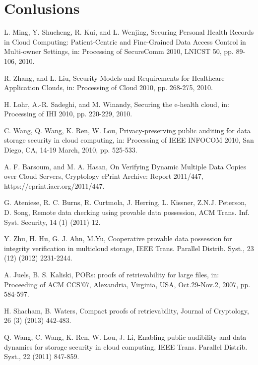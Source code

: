 \documentclass{article}
\begin{document}
\section {Conlusions}
\renewcommand\refname{Reference}
\begin{thebibliography}{00}
    L. Ming, Y. Shucheng, R. Kui, and L. Wenjing, Securing Personal Health Records in Cloud Computing: Patient-Centric and Fine-Grained
    Data Access Control in Multi-owner Settings, in: Processing of SecureComm 2010, LNICST 50, pp. 89-106, 2010.
    
    R. Zhang, and L. Liu, Security Models and Requirements for Healthcare Application Clouds, in: Processing of  Cloud 2010, pp. 268-275, 2010.
    
    H. Lohr, A.-R. Sadeghi, and M. Winandy, Securing the e-health cloud, in: Processing of  IHI 2010, pp. 220-229, 2010.
    
    C. Wang, Q. Wang, K. Ren, W. Lou, Privacy-preserving public auditing for data storage security in cloud computing, in: Processing of IEEE INFOCOM 2010, San Diego, CA, 14-19 March, 2010, pp. 525-533.
    
    A. F. Barsoum, and M. A. Hasan, On Verifying Dynamic Multiple Data Copies over Cloud Servers, Cryptology ePrint Archive: Report 2011/447, https://eprint.iacr.org/2011/447.
    
    
    G. Ateniese, R. C. Burns, R. Curtmola, J. Herring, L. Kissner, Z.N.J. Peterson, D. Song,  Remote data checking using provable data possession, ACM Trans. Inf. Syst. Security, 14 (1) (2011) 12.
    
    Y. Zhu, H. Hu, G. J. Ahn, M.Yu, Cooperative provable data possession for integrity verification in multicloud storage, IEEE Trans. Parallel Distrib. Syst., 23 (12) (2012) 2231-2244.
    
    
    A. Juels, B. S. Kaliski, PORs: proofs of retrievability for large files, in: Proceeding of ACM CCS'07, Alexandria, Virginia, USA, Oct.29-Nov.2, 2007, pp. 584-597.
    
    H. Shacham, B. Waters, Compact proofs of retrievability, Journal of Cryptology, 26 (3) (2013) 442-483.
    
    
    Q. Wang, C. Wang, K. Ren, W. Lou, J. Li, Enabling public audibility and data
    dynamics for storage security in cloud computing, IEEE Trans. Parallel Distrib. Syst., 22 (2011) 847-859.
    

\end{thebibliography}
\end{document}
